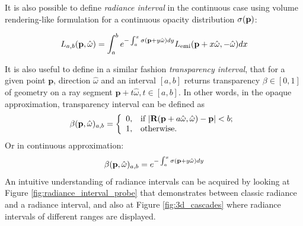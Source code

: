 \documentclass{jcgt}
\begin{document}
It is also possible to define \emph{radiance interval} in the continuous case using volume rendering-like formulation for a continuous opacity distribution $\sigma(\textbf p)$:

\begin{equation}
  \label{eq:def_radiance_volume}
  L_{a,b}(\textbf{p}, \hat \omega) = 
  \int_a^b e^{-\int_a^x \sigma(\textbf p + y\hat \omega)dy} L_\mathrm{emi}(\textbf p+x\hat \omega, -\hat \omega)dx
\end{equation}

It is also useful to define in a similar fashion \emph{transparency interval}, that for a given point $\textbf{p}$, direction $\hat \omega$ and an interval $[a, b]$ returns transparency $\beta \in [0,1]$ of geometry on a ray segment $\textbf{p} + t \hat \omega, t \in [a,b]$. In other words, in the opaque approximation, transparency interval can be defined as
\begin{equation}
  \beta(\textbf p, \hat \omega)_{a, b} = \left\{
  \begin{array}{ll}  
    0, & \text{if\ } |\textbf R(\textbf p + a \hat \omega, \hat \omega)-\textbf p| < b; \\
    1, & \text{otherwise}.
  \end{array}\right.
\end{equation}
Or in continuous approximation:
\begin{equation}
  \beta(\textbf p, \hat \omega)_{a, b} =
  e^{-\int_a^x \sigma(\textbf p + y\hat \omega)dy}
\end{equation}
An intuitive understanding of radiance intervals can be acquired by looking at Figure \ref{fig:radiance_interval_probe} that demonstrates between classic radiance and a radiance interval, and also at Figure \ref{fig:3d_cascades} where radiance intervals of different ranges are displayed.
\end{document}
